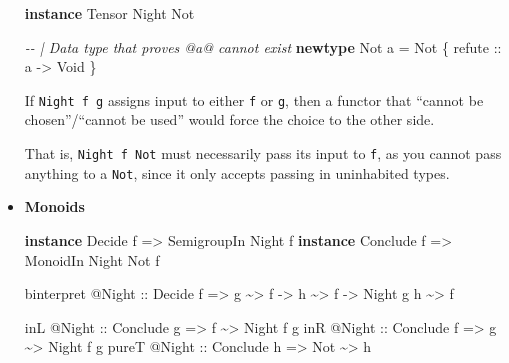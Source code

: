 \documentclass[]{article}
\newenvironment{Shaded}{}{}
\newcommand{\CommentTok}[1]{\textcolor[rgb]{0.38,0.63,0.69}{\textit{#1}}}
\newcommand{\DataTypeTok}[1]{\textcolor[rgb]{0.56,0.13,0.00}{#1}}
\newcommand{\KeywordTok}[1]{\textcolor[rgb]{0.00,0.44,0.13}{\textbf{#1}}}
\newcommand{\NormalTok}[1]{#1}
\newcommand{\OperatorTok}[1]{\textcolor[rgb]{0.40,0.40,0.40}{#1}}
\newcommand{\OtherTok}[1]{\textcolor[rgb]{0.00,0.44,0.13}{#1}}
\begin{document}
\begin{itemize}
\begin{Shaded}
\begin{Highlighting}[]
\KeywordTok{instance} \DataTypeTok{Tensor} \DataTypeTok{Night} \DataTypeTok{Not}

\CommentTok{{-}{-} | Data type that proves @a@ cannot exist}
\KeywordTok{newtype} \DataTypeTok{Not}\NormalTok{ a }\OtherTok{=} \DataTypeTok{Not}\NormalTok{ \{}\OtherTok{ refute ::}\NormalTok{ a }\OtherTok{{-}>} \DataTypeTok{Void}\NormalTok{ \}}
\end{Highlighting}
\end{Shaded}

  If \texttt{Night\ f\ g} assigns input to either \texttt{f} or \texttt{g}, then
  a functor that ``cannot be chosen''/``cannot be used'' would force the choice
  to the other side.

  That is, \texttt{Night\ f\ Not} must necessarily pass its input to \texttt{f},
  as you cannot pass anything to a \texttt{Not}, since it only accepts passing
  in uninhabited types.
\item
  \textbf{Monoids}

\begin{Shaded}
\begin{Highlighting}[]
\KeywordTok{instance} \DataTypeTok{Decide}\NormalTok{   f }\OtherTok{=>} \DataTypeTok{SemigroupIn} \DataTypeTok{Night}\NormalTok{ f}
\KeywordTok{instance} \DataTypeTok{Conclude}\NormalTok{ f }\OtherTok{=>} \DataTypeTok{MonoidIn}    \DataTypeTok{Night} \DataTypeTok{Not}\NormalTok{ f}

\NormalTok{binterpret }\OperatorTok{@}\DataTypeTok{Night}
\OtherTok{    ::} \DataTypeTok{Decide}\NormalTok{ f}
    \OtherTok{=>}\NormalTok{ g }\OperatorTok{\textasciitilde{}>}\NormalTok{ f}
    \OtherTok{{-}>}\NormalTok{ h }\OperatorTok{\textasciitilde{}>}\NormalTok{ f}
    \OtherTok{{-}>} \DataTypeTok{Night}\NormalTok{ g h }\OperatorTok{\textasciitilde{}>}\NormalTok{ f}

\NormalTok{inL   }\OperatorTok{@}\DataTypeTok{Night}\OtherTok{ ::} \DataTypeTok{Conclude}\NormalTok{ g }\OtherTok{=>}\NormalTok{ f   }\OperatorTok{\textasciitilde{}>} \DataTypeTok{Night}\NormalTok{ f g}
\NormalTok{inR   }\OperatorTok{@}\DataTypeTok{Night}\OtherTok{ ::} \DataTypeTok{Conclude}\NormalTok{ f }\OtherTok{=>}\NormalTok{ g   }\OperatorTok{\textasciitilde{}>} \DataTypeTok{Night}\NormalTok{ f g}
\NormalTok{pureT }\OperatorTok{@}\DataTypeTok{Night}\OtherTok{ ::} \DataTypeTok{Conclude}\NormalTok{ h }\OtherTok{=>} \DataTypeTok{Not} \OperatorTok{\textasciitilde{}>}\NormalTok{ h}
\end{Highlighting}
\end{Shaded}


\end{itemize}
\end{document}
